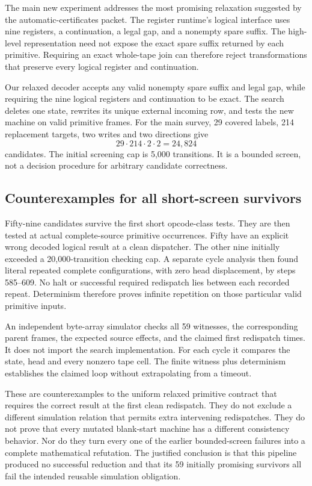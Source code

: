 \documentclass[11pt,letterpaper]{article}
\theoremstyle{definition}\newtheorem{definition}[theorem]{Definition}
\begin{document}
The main new experiment addresses the most promising relaxation suggested by
the automatic-certificates packet. The register runtime's logical interface
uses nine registers, a continuation, a legal gap, and a nonempty spare suffix.
The high-level representation need not expose the exact spare suffix returned
by each primitive. Requiring an exact whole-tape join can therefore reject
transformations that preserve every logical register and continuation.

Our relaxed decoder accepts any valid nonempty spare suffix and legal gap,
while requiring the nine logical registers and continuation to be exact. The
search deletes one state, rewrites its unique external incoming row, and tests
the new machine on valid primitive frames. For the main survey, 29 covered
labels, 214 replacement targets, two writes and two directions give
\[
 29\cdot214\cdot2\cdot2=24,824
\]
candidates. The initial screening cap is 5,000 transitions. It is a bounded
screen, not a decision procedure for arbitrary candidate correctness.

\subsection{Counterexamples for all short-screen survivors}

Fifty-nine candidates survive the first short opcode-class tests. They are
then tested at actual complete-source primitive occurrences. Fifty have an
explicit wrong decoded logical result at a clean dispatcher. The other nine
initially exceeded a 20,000-transition checking cap. A separate cycle analysis
then found literal repeated complete configurations, with zero head
displacement, by steps 585--609. No halt or successful required redispatch lies
between each recorded repeat. Determinism therefore proves infinite repetition
on those particular valid primitive inputs.

An independent byte-array simulator checks all 59 witnesses, the corresponding
parent frames, the expected source effects, and the claimed first redispatch
times. It does not import the search implementation. For each cycle it compares
the state, head and every nonzero tape cell. The finite witness plus
determinism establishes the claimed loop without extrapolating from a timeout.

These are counterexamples to the uniform relaxed primitive contract that
requires the correct result at the first clean redispatch. They do not exclude
a different simulation relation that permits extra intervening redispatches. They do
not prove that every mutated blank-start machine has a different consistency
behavior. Nor do they turn every one of the earlier bounded-screen failures
into a complete mathematical refutation. The justified conclusion is that this
pipeline produced no successful reduction and that its 59 initially promising
survivors all fail the intended reusable simulation obligation.
\end{document}
